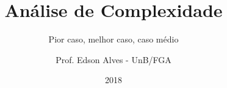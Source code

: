 \title{Análise de Complexidade}
\subtitle{Pior caso, melhor caso, caso médio}
\author{Prof. Edson Alves - UnB/FGA}
\date{2018}

